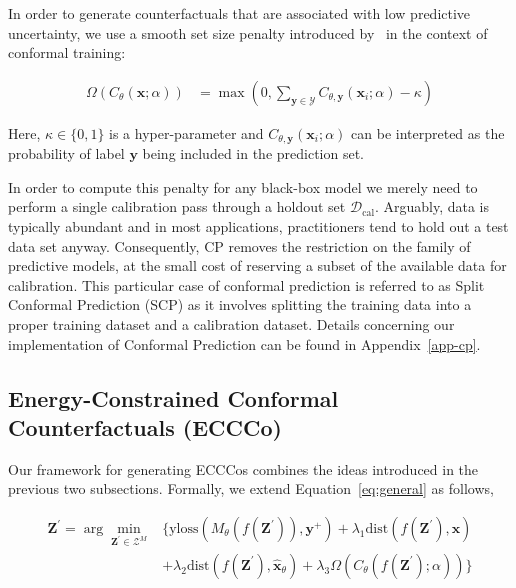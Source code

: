 \documentclass{article}
\begin{document}
In order to generate counterfactuals that are associated with low predictive uncertainty, we use a smooth set size penalty introduced by~\citet{stutz2022learning} in the context of conformal training:

\begin{equation}\label{eq:setsize}
  \begin{aligned}
    \Omega(C_{\theta}(\mathbf{x};\alpha))&=\max \left(0, \sum_{\mathbf{y}\in\mathcal{Y}}C_{\theta,\mathbf{y}}(\mathbf{x}_i;\alpha) - \kappa \right)
  \end{aligned}
\end{equation}

Here, $\kappa \in \{0,1\}$ is a hyper-parameter and $C_{\theta,\mathbf{y}}(\mathbf{x}_i;\alpha)$ can be interpreted as the probability of label $\mathbf{y}$ being included in the prediction set. 

In order to compute this penalty for any black-box model we merely need to perform a single calibration pass through a holdout set $\mathcal{D}_{\text{cal}}$. Arguably, data is typically abundant and in most applications, practitioners tend to hold out a test data set anyway. Consequently, CP removes the restriction on the family of predictive models, at the small cost of reserving a subset of the available data for calibration. This particular case of conformal prediction is referred to as Split Conformal Prediction (SCP) as it involves splitting the training data into a proper training dataset and a calibration dataset. Details concerning our implementation of Conformal Prediction can be found in Appendix~\ref{app-cp}.

\subsection{Energy-Constrained Conformal Counterfactuals (ECCCo)}

Our framework for generating ECCCos combines the ideas introduced in the previous two subsections. Formally, we extend Equation~\ref{eq:general} as follows,

\begin{equation} \label{eq:eccco}
  \begin{aligned}
  \mathbf{Z}^\prime= \arg \min_{\mathbf{Z}^\prime \in \mathcal{Z}^M}  &\{  {\text{yloss}(M_{\theta}(f(\mathbf{Z}^\prime)),\mathbf{y}^+)}+ \lambda_{1} {\text{dist}(f(\mathbf{Z}^\prime),\mathbf{x}) } \\
  &+ \lambda_2 \text{dist}(f(\mathbf{Z}^\prime),\hat{\mathbf{x}}_{\theta}) + \lambda_3 \Omega(C_{\theta}(f(\mathbf{Z}^\prime);\alpha)) \} 
  \end{aligned} 
\end{equation}
\end{document}
